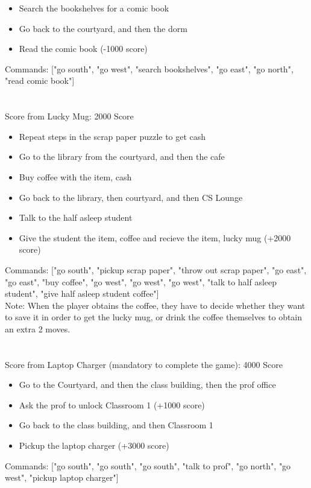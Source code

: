 \documentclass[11pt]{article}
\begin{document}
\begin{enumerate}
\begin{itemize}
            \item Search the bookshelves for a comic book
            \item Go back to the courtyard, and then the dorm
            \item Read the comic book (-1000 score)
        \end{itemize}
Commands: ["go south", "go west",  "search bookshelves", "go east", "go north", "read comic book"]
\\\\\\
Score from Lucky Mug: 2000 Score
        \begin{itemize}
            \item Repeat steps in the scrap paper puzzle to get cash
            \item Go to the library from the courtyard, and then the cafe
            \item Buy coffee with the item, cash
            \item Go back to the library, then courtyard, and then CS Lounge
            \item Talk to the half asleep student
            \item Give the student the item, coffee and recieve the item, lucky mug (+2000 score)
        \end{itemize}
Commands: ["go south", "pickup scrap paper", "throw out scrap paper", "go east", "go east", "buy coffee", "go west", "go west", "go west", "talk to half asleep student", "give half asleep student coffee"]\\
Note: When the player obtains the coffee, they have to decide whether they want to save it in order to get the lucky mug, or drink the coffee themselves to obtain an extra 2 moves.
\\\\\\
Score from Laptop Charger (mandatory to complete the game): 4000 Score
        \begin{itemize}
            \item Go to the Courtyard, and then the class building, then the prof office
            \item Ask the prof to unlock Classroom 1 (+1000 score)
            \item Go back to the class building, and then Classroom 1
            \item Pickup the laptop charger (+3000 score)
        \end{itemize}
Commands: ["go south", "go south",  "go south", "talk to prof", "go north", "go west", "pickup laptop charger"]

\end{enumerate}
\end{document}
